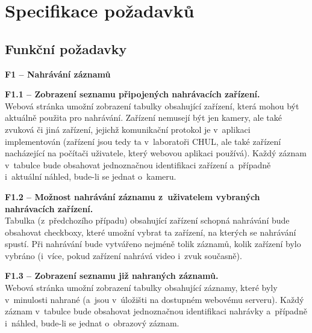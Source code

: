 \documentclass[thesis=M,czech]{FITthesis}[2012/06/26]
\begin{document}
\section{Specifikace požadavků} \label{sec:analyza_pozadavky}
\subsection{Funkční požadavky} \label{subsec:analyza_fp}
\begin{description}
  \item \textbf{F1 -- Nahrávání záznamů}
  \begin{description}
    \item \textbf{F1.1 -- Zobrazení seznamu připojených nahrávacích zařízení.\\}
	Webová stránka umožní zobrazení tabulky obsahující zařízení, která mohou být aktuálně použita pro nahrávání. Zařízení nemusejí být jen kamery, ale také zvuková či jiná zařízení, jejichž komunikační protokol je v~aplikaci implementován (zařízení jsou tedy ta v~laboratoři CHUL, ale také zařízení nacházející na počítači uživatele, který webovou aplikaci používá). Každý záznam v~tabulce bude obsahovat jednoznačnou identifikaci zařízení a~případně i~aktuální náhled, bude-li se jednat o~kameru.
    \item \textbf{F1.2 -- Možnost nahrávání záznamu z~uživatelem vybraných nahrávacích zařízení.\\}
	Tabulka (z~předchozího případu) obsahující zařízení schopná nahrávání bude obsahovat checkboxy, které umožní vybrat ta zařízení, na kterých se nahrávání spustí. Při nahrávání bude vytvářeno nejméně tolik záznamů, kolik zařízení bylo vybráno (i~více, pokud zařízení nahrává video i~zvuk současně).
    \item \textbf{F1.3 -- Zobrazení seznamu již nahraných záznamů.\\}
	Webová stránka umožní zobrazení tabulky obsahující záznamy, které byly v~minulosti nahrané (a~jsou v~úložišti na dostupném webovému serveru). Každý záznam v~tabulce bude obsahovat jednoznačnou identifikaci nahrávky a~případně i~náhled, bude-li se jednat o~obrazový záznam.

  \end{description}


\end{description}
\end{document}
